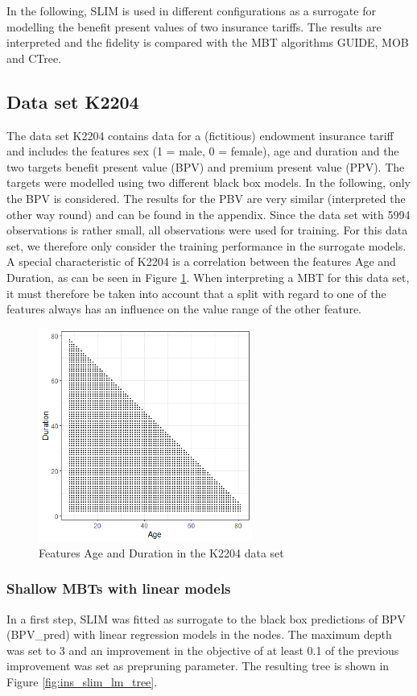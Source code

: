 In the following, SLIM is used in different configurations as a surrogate for modelling the benefit present values of two insurance tariffs. The results are interpreted and the fidelity is compared with the MBT algorithms GUIDE, MOB and CTree.

\subsection{Data set K2204}
The data set K2204 contains data for a (fictitious) endowment insurance tariff and includes the features sex (1 = male, 0 = female), age and duration and the two targets benefit present value (BPV) and premium present value (PPV). The targets were modelled using two different black box models.  
In the following, only the BPV is considered. The results for the PBV are very similar (interpreted the other way round) and can be found in the appendix.
Since the data set with 5994 observations is rather small, all observations were used for training. For this data set, we therefore only consider the training performance in the surrogate models.
A special characteristic of K2204 is a correlation between the features Age and Duration, as can be seen in Figure \ref{fig:ins_corr_age_duration}. When interpreting a MBT for this data set, it must therefore be taken into account that a split with regard to one of the features always has an influence on the value range of the other feature.

\begin{figure}[!htb]
    \centering    
    \includegraphics[width=7cm]{Figures/insurance_use_case/k2204_BPV/corr_age_duration.png}
    \caption{Features Age and Duration in the K2204 data set}
    \label{fig:ins_corr_age_duration}
\end{figure}


\subsubsection{Shallow MBTs with linear models}
In a first step, SLIM was fitted as surrogate to the black box predictions of BPV (BPV\_pred) with linear regression models in the nodes. The maximum depth was set to 3 and an improvement in the objective of at least 0.1 of the previous improvement was set as prepruning parameter.
 The resulting tree is shown in Figure \ref{fig:ins_slim_lm_tree}.

